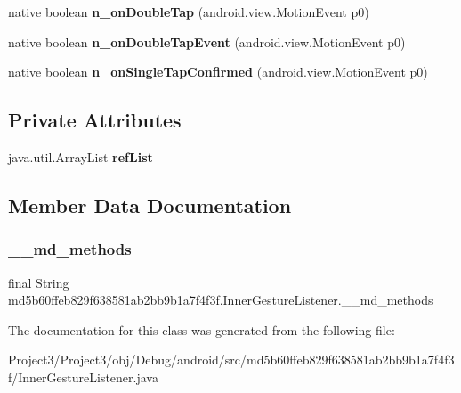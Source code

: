 \begin{DoxyCompactItemize}
native boolean {\bfseries n\+\_\+on\+Double\+Tap} (android.\+view.\+Motion\+Event p0)
\item 
\mbox{\label{classmd5b60ffeb829f638581ab2bb9b1a7f4f3f_1_1InnerGestureListener_aa21c0778bbf55b409cb91a62fa883b9e}} 
native boolean {\bfseries n\+\_\+on\+Double\+Tap\+Event} (android.\+view.\+Motion\+Event p0)
\item 
\mbox{\label{classmd5b60ffeb829f638581ab2bb9b1a7f4f3f_1_1InnerGestureListener_a91f9c46ec0b4d61ff8b2407b107aed2b}} 
native boolean {\bfseries n\+\_\+on\+Single\+Tap\+Confirmed} (android.\+view.\+Motion\+Event p0)
\end{DoxyCompactItemize}
\subsection*{Private Attributes}
\begin{DoxyCompactItemize}
\item 
\mbox{\label{classmd5b60ffeb829f638581ab2bb9b1a7f4f3f_1_1InnerGestureListener_acfa733c8a1acdacd60c262d75991bf59}} 
java.\+util.\+Array\+List {\bfseries ref\+List}
\end{DoxyCompactItemize}


\subsection{Member Data Documentation}
\mbox{\label{classmd5b60ffeb829f638581ab2bb9b1a7f4f3f_1_1InnerGestureListener_ae6fdb0c574b25527e6407117dcb68256}} 
\subsubsection{\texorpdfstring{\+\_\+\+\_\+md\+\_\+methods}{\_\_md\_methods}}
{\footnotesize\ttfamily final String md5b60ffeb829f638581ab2bb9b1a7f4f3f.\+Inner\+Gesture\+Listener.\+\_\+\+\_\+md\+\_\+methods\hspace{0.3cm}{\ttfamily [static]}}



The documentation for this class was generated from the following file\+:\begin{DoxyCompactItemize}
\item 
Project3/\+Project3/obj/\+Debug/android/src/md5b60ffeb829f638581ab2bb9b1a7f4f3f/Inner\+Gesture\+Listener.\+java\end{DoxyCompactItemize}
